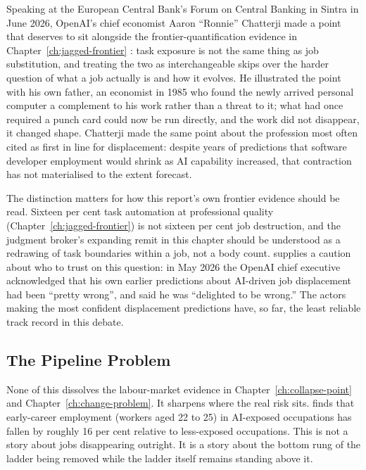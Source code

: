 Speaking at the European Central Bank's Forum on Central Banking in Sintra in June 2026, OpenAI's chief economist Aaron ``Ronnie'' Chatterji made a point that deserves to sit alongside the frontier-quantification evidence in Chapter~\ref{ch:jagged-frontier} \parencite{Chatterji2026}: task exposure is not the same thing as job substitution, and treating the two as interchangeable skips over the harder question of what a job actually is and how it evolves. He illustrated the point with his own father, an economist in 1985 who found the newly arrived personal computer a complement to his work rather than a threat to it; what had once required a punch card could now be run directly, and the work did not disappear, it changed shape. Chatterji made the same point about the profession most often cited as first in line for displacement: despite years of predictions that software developer employment would shrink as AI capability increased, that contraction has not materialised to the extent forecast.

The distinction matters for how this report's own frontier evidence should be read. Sixteen per cent task automation at professional quality (Chapter~\ref{ch:jagged-frontier}) is not sixteen per cent job destruction, and the judgment broker's expanding remit in this chapter should be understood as a redrawing of task boundaries within a job, not a body count. \textcite{AltmanReversal2026} supplies a caution about who to trust on this question: in May 2026 the OpenAI chief executive acknowledged that his own earlier predictions about AI-driven job displacement had been ``pretty wrong'', and said he was ``delighted to be wrong.'' The actors making the most confident displacement predictions have, so far, the least reliable track record in this debate.

\subsection{The Pipeline Problem}

None of this dissolves the labour-market evidence in Chapter~\ref{ch:collapse-point} and Chapter~\ref{ch:change-problem}. It sharpens where the real risk sits. \textcite{Brynjolfsson2025Canaries} finds that early-career employment (workers aged 22 to 25) in AI-exposed occupations has fallen by roughly 16 per cent relative to less-exposed occupations. This is not a story about jobs disappearing outright. It is a story about the bottom rung of the ladder being removed while the ladder itself remains standing above it.

